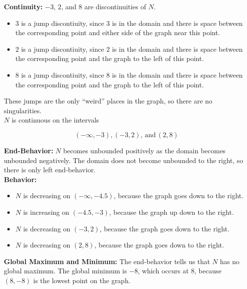 \documentclass{ximera}
\begin{document}
\begin{example}
\textbf{Continuity:}  $-3$, $2$, and $8$ are discontinuities of $N$. 

\begin{itemize}
\item $3$ is a jump discontiuity, since $3$ is in the domain and there is space between the corresponding point and either side of the graph near this point. \\
\item $2$ is a jump discontiuity, since $2$ is in the domain and there is space between the corresponding point and the graph to the left of this point. \\
\item $8$ is a jump discontiuity, since $8$ is in the domain and there is space between the corresponding point and the graph to the left of this point. \\
\end{itemize}


These jumps are the only ``weird'' places in the graph, so there are no singularities. \\


$N$ is continuous on the intervals

\[
(-\infty, -3), (-3, 2), \, \text{and} \, (2, 8)
\]


\textbf{End-Behavior:}  $N$ becomes unbounded positively as the domain becomes unbounded negatively.  The domain does not become unbounded to the right, so there is only left end-behavior.\\

\textbf{Behavior:}  

\begin{itemize}
     \item $N$ is decreasing on $(-\infty, -4.5)$, because the graph goes down to the right.
     \item $N$ is increasing on $(-4.5, -3)$, because the graph up down to the right.
     \item $N$ is decreasing on $(-3, 2)$, because the graph goes down to the right.
     \item $N$ is decreasing on $(2, 8)$, because the graph goes down to the right.
\end{itemize}



\textbf{Global Maximum and Minimum:} The end-behavior tells us that $N$ has no global maximum.  The global minimum is $-8$, which occurs at $8$, because $(8,-8)$ is the lowest point on the graph. \\



\end{example}
\end{document}
